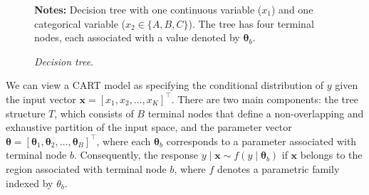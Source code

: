 \begin{figure}[h!]
	\centering
{}
\begin{tablenotes}
	\item \small{\textbf{Notes:} Decision tree with one continuous variable ($x_1$) and one categorical variable ($x_2 \in \{A, B, C\}$). The tree has four terminal nodes, each associated with a value denoted by $\boldsymbol{\theta}_b$.}
\end{tablenotes}
\caption{\textit{Decision tree}.}
\label{fig:tree}
\end{figure}	

We can view a CART model as specifying the conditional distribution of \( y \) given the input vector \( \mathbf{x} = [x_1, x_2, \dots, x_K]^{\top} \). There are two main components: the tree structure \( T \), which consists of \( B \) terminal nodes that define a non-overlapping and exhaustive partition of the input space, and the parameter vector \( \boldsymbol{\theta} = [\boldsymbol{\theta}_1, \boldsymbol{\theta}_2, \dots, \boldsymbol{\theta}_B]^{\top} \), where each \( \boldsymbol{\theta}_b \) corresponds to a parameter associated with terminal node \( b \). Consequently, the response \( y \mid \mathbf{x} \sim f(y \mid \boldsymbol{\theta}_b) \) if \( \mathbf{x} \) belongs to the region associated with terminal node \( b \), where \( f \) denotes a parametric family indexed by \( \theta_b \).

